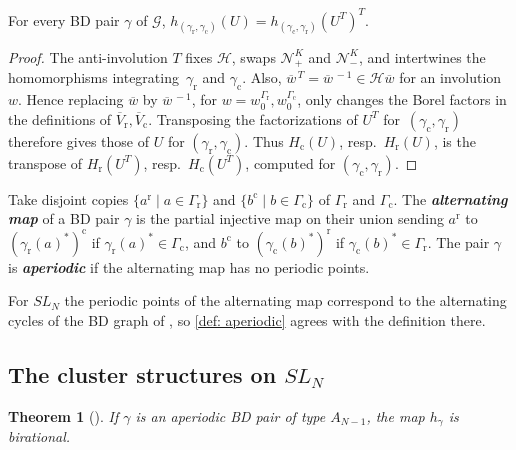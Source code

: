 \documentclass[a4paper]{amsart}
\numberwithin{equation}{section}
\newtheorem{theorem}{Theorem}[section]
\theoremstyle{definition}
\theoremstyle{remark}
\newcommand{\mcG}{\mathcal{G}}
\newcommand{\mcH}{\mathcal{H}}
\newcommand{\mcN}{\mathcal{N}}
\newcommand{\rr}{\mathrm{r}}
\newcommand{\cc}{\mathrm{c}}
\newcommand{\newword}[1]{\textbf{\emph{#1}}}
\begin{document}
\begin{lemma}
  \label{lem: h transpose}
  For every BD pair $\gamma$ of $\mcG$, $h_{(\gamma_{\rr},\gamma_{\cc})}(U)=h_{(\gamma_{\cc},\gamma_{\rr})}(U^T)^T$.
\end{lemma}
\begin{proof}
  The anti-involution $T$ fixes $\mcH$, swaps $\mcN_+^K$ and $\mcN_-^K$, and intertwines the homomorphisms integrating~$\gamma_{\rr}$ and $\gamma_{\cc}$.
  Also, $\overline{w}^{\,T}=\overline{w}^{\,-1}\in\mcH\overline{w}$ for an involution $w$.
  Hence replacing $\overline{w}$ by $\overline{w}^{\,-1}$, for $w=w_0^{\Gamma_{\rr}},w_0^{\Gamma_{\cc}}$, only changes the Borel factors in the definitions of $\overline{V}_{\rr},\overline{V}_{\cc}$.
  Transposing the factorizations of $U^T$ for~$(\gamma_{\cc},\gamma_{\rr})$ therefore gives those of $U$ for $(\gamma_{\rr},\gamma_{\cc})$.
  Thus $H_{\cc}(U)$, resp.\ $H_{\rr}(U)$, is the transpose of $H_{\rr}(U^T)$, resp.\ $H_{\cc}(U^T)$, computed for $(\gamma_{\cc},\gamma_{\rr})$.
\end{proof}

\begin{definition}
  \label{def: aperiodic}
  Take disjoint copies $\{a^\rr\mid a\in\Gamma_{\rr}\}$ and $\{b^\cc\mid b\in\Gamma_{\cc}\}$ of $\Gamma_{\rr}$ and $\Gamma_{\cc}$.
  The \newword{alternating map} of a BD pair $\gamma$ is the partial injective map on their union sending $a^\rr$ to $(\gamma_{\rr}(a)^*)^\cc$ if $\gamma_{\rr}(a)^*\in\Gamma_{\cc}$, and $b^\cc$ to $(\gamma_{\cc}(b)^*)^\rr$ if $\gamma_{\cc}(b)^*\in\Gamma_{\rr}$.
  The pair $\gamma$ is \newword{aperiodic} if the alternating map has no periodic points.
\end{definition}

For $SL_N$ the periodic points of the alternating map correspond to the alternating cycles of the BD graph of \cite[Section~4.1]{GSV23}, so \cref{def: aperiodic} agrees with the definition there.

\subsection{The cluster structures on \texorpdfstring{$SL_N$}{SLN}}
\label{sec: GSV}
\begin{theorem}[{\cite[Section~1, Theorem~4.4 and (4.6)]{GSV23}}]
  \label{thm: GSV h}
  If $\gamma$ is an aperiodic BD pair of type $A_{N-1}$, the map $h_\gamma$ is birational.
\end{theorem}
\end{document}
